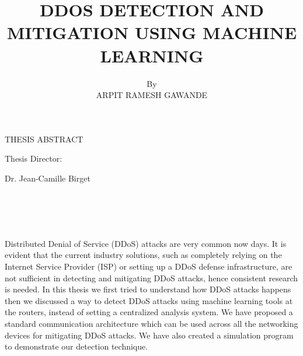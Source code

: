 \documentclass[12pt,oneside,a4paper]{article}
\title{DDOS DETECTION AND MITIGATION USING MACHINE LEARNING}
\author{By \\ ARPIT RAMESH GAWANDE}
\date{}
\begin{document}
\renewcommand{\thepage}{\roman{page}}%
\setcounter{page}{2}%
\makeatletter
{\centering THESIS ABSTRACT \par
\vspace{3mm}
\large\@title \par
\vspace{3mm}
\@author \par
\vspace{3mm}
Thesis Director: \par
Dr. Jean-Camille Birget \par}
\\~\\~\\~\\ %
Distributed Denial of Service (DDoS) attacks are very common now days. It is evident that the current industry solutions, such as completely relying on the Internet Service Provider (ISP) or setting up a DDoS defense infrastructure, are not sufficient in detecting and mitigating DDoS attacks, hence consistent research is needed. In this thesis we first tried to understand how DDoS attacks happens then we discussed a way to detect DDoS attacks using machine learning tools at the routers, instead of setting a centralized analysis system. We have proposed a standard communication architecture which can be used across all the networking devices for mitigating DDoS attacks. We have also created a simulation program to demonstrate our detection technique.
\end{document}

